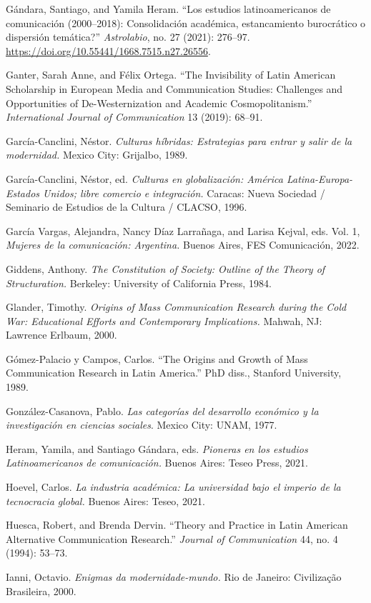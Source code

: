 \documentclass{tufte-handout}
\begin{document}
\begin{hangparas}{.25in}{1}
Gándara, Santiago, and Yamila Heram. ``Los estudios latinoamericanos de
comunicación (2000--2018): Consolidación académica, estancamiento
burocrático o dispersión temática?'' \emph{Astrolabio}, no. 27 (2021):
276--97. \url{https://doi.org/10.55441/1668.7515.n27.26556}.

Ganter, Sarah Anne, and Félix Ortega. ``The Invisibility of Latin
American Scholarship in European Media and Communication Studies:
Challenges and Opportunities of De-Westernization and Academic
Cosmopolitanism.'' \emph{International Journal of Communication} 13
(2019): 68--91.

García-Canclini, Néstor. \emph{Culturas híbridas: Estrategias para
entrar y salir de la modernidad.} Mexico City: Grijalbo, 1989.

\pagebreak García-Canclini, Néstor, ed. \emph{Culturas en globalización: América
Latina-Europa-Estados Unidos; libre comercio e integración.} Caracas:
Nueva Sociedad / Seminario de Estudios de la Cultura / CLACSO, 1996.

García Vargas, Alejandra, Nancy Díaz Larrañaga, and Larisa Kejval, eds.
Vol. 1, \emph{Mujeres de la comunicación: Argentina.} Buenos Aires, FES
Comunicación, 2022.

Giddens, Anthony. \emph{The Constitution of Society: Outline of the
Theory of Structuration.} Berkeley: University of California Press,
1984.

Glander, Timothy. \emph{Origins of Mass Communication Research during
the Cold War: Educational Efforts and Contemporary Implications.}
Mahwah, NJ: Lawrence Erlbaum, 2000.

Gómez-Palacio y Campos, Carlos. ``The Origins and Growth of Mass
Communication Research in Latin America.'' PhD diss., Stanford
University, 1989.

González-Casanova, Pablo. \emph{Las categorías del desarrollo económico
y la investigación en ciencias sociales}. Mexico City: UNAM, 1977.

Heram, Yamila, and Santiago Gándara, eds. \emph{Pioneras en los estudios
Latinoamericanos de comunicación.} Buenos Aires: Teseo Press, 2021.

Hoevel, Carlos. \emph{La industria académica: La universidad bajo el
imperio de la tecnocracia global.} Buenos Aires: Teseo, 2021.

Huesca, Robert, and Brenda Dervin. ``Theory and Practice in Latin
American Alternative Communication Research.'' \emph{Journal of
Communication} 44, no. 4 (1994): 53--73.

Ianni, Octavio. \emph{Enigmas da modernidade-mundo.} Rio de Janeiro:
Civilização Brasileira, 2000.


\end{hangparas}
\end{document}
